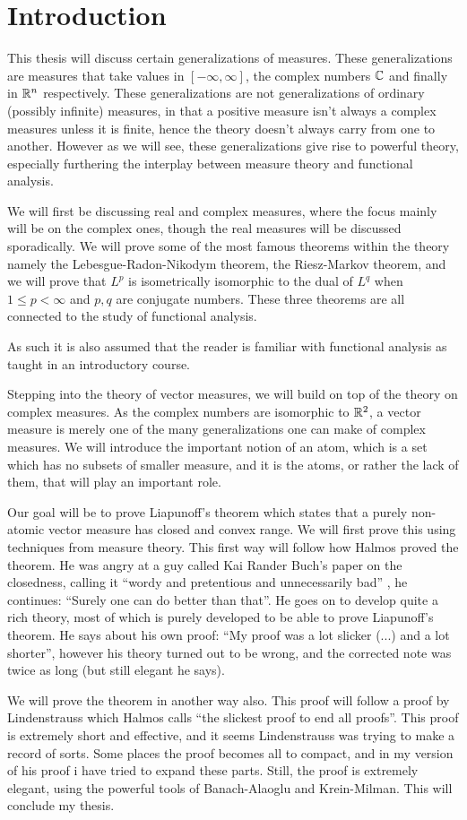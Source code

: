 \section{Introduction}

This thesis will discuss certain generalizations of measures. These generalizations are measures that take values in $[-\infty, \infty]$, the complex numbers $\mathbb{C}$ and finally in $\mathbb{R}^{n}$ respectively. These generalizations are not generalizations of ordinary (possibly infinite) measures, in that a positive measure isn't always a complex measures unless it is finite, hence the theory doesn't always carry from one to another. However as we will see, these generalizations give rise to powerful theory, especially furthering the interplay between measure theory and functional analysis.

We will first be discussing real and complex measures, where the focus mainly will be on the complex ones, though the real measures will be discussed sporadically. We will prove some of the most famous theorems within the theory namely the Lebesgue-Radon-Nikodym theorem, the Riesz-Markov theorem, and we will prove that $L^{p}$ is isometrically isomorphic to the dual of $L^{q}$ when $1\le p < \infty$ and $p,q$ are conjugate numbers. These three theorems are all connected to the study of functional analysis.

As such it is also assumed that the reader is familiar with functional analysis as taught in an introductory course.

Stepping into the theory of vector measures, we will build on top of the theory on complex measures. As the complex numbers are isomorphic to $\mathbb{R}^{2}$, a vector measure is merely one of the many generalizations one can make of complex measures. We will introduce the important notion of an atom, which is a set which has no subsets of smaller measure, and it is the atoms, or rather the lack of them, that will play an important role.

Our goal will be to prove Liapunoff's theorem which states that a purely non-atomic vector measure has closed and convex range. We will first prove this using techniques from measure theory. This first way will follow how Halmos proved the theorem. He was angry at a guy called Kai Rander Buch's paper on the closedness, calling it ``wordy and pretentious and unnecessarily bad'' \cite{Halmos}, he continues: ``Surely one can do better than that''. He goes on to develop quite a rich theory, most of which is purely developed to be able to prove Liapunoff's theorem. He says about his own proof: ``My proof was a lot slicker (...) and a lot shorter'', however his theory turned out to be wrong, and the corrected note was twice as long (but still elegant he says).

We will prove the theorem in another way also. This proof will follow a proof by Lindenstrauss which Halmos calls ``the slickest proof to end all proofs''. This proof is extremely short and effective, and it seems Lindenstrauss was trying to make a record of sorts. Some places the proof becomes all to compact, and in my version of his proof i have tried to expand these parts. Still, the proof is extremely elegant, using the powerful tools of Banach-Alaoglu and Krein-Milman. This will conclude my thesis.

